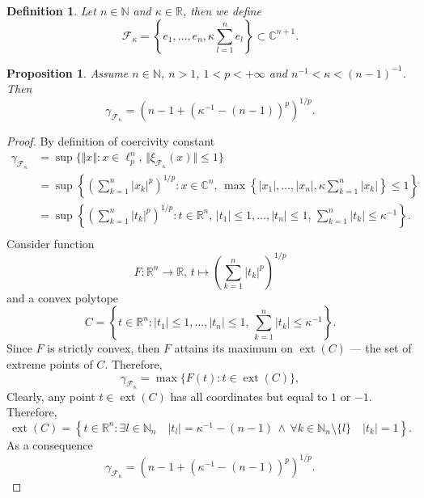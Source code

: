\documentclass[12pt]{article}
\newtheorem{proposition}[theorem]{Proposition}
\newtheorem{definition}[theorem]{Definition}
\begin{document}
\begin{definition}\label{SpclFuncFam}
    Let $n\in\mathbb{N}$ and $\kappa\in\mathbb{R}$, then we define 
    \[
        \mathcal{F}_{\kappa}
        =\left\{e_1,\ldots,e_n,\kappa \sum_{l=1}^n e_l\right\}
        \subset \mathbb{C}^{n+1}.
    \]
\end{definition}

\begin{proposition}\label{StdEmbdSpclCoerciv}
    Assume $n\in\mathbb{N}$, $n>1$, $1<p<+\infty$ 
    and $n^{-1}<\kappa<(n-1)^{-1}$. Then
    \[
        \gamma_{\mathcal{F}_{\kappa}}=(n-1+(\kappa^{-1}-(n-1))^p)^{1/p}.
    \]
\end{proposition}
\begin{proof}
    By definition of coercivity constant
    \[
    \begin{aligned}
        \gamma_{\mathcal{F}_{\kappa}}
        &=\sup\{
            \Vert x\Vert : 
            x\in\ell_{p}^n,\, \Vert \xi_{\mathcal{F}_{\kappa}}(x)\Vert\leq 1
        \} \\
        &=\sup\left\{
            \left( \sum_{k=1}^n |x_k|^p\right)^{1/p} : 
            x\in\mathbb{C}^n,\, 
            \max\left\{|x_1|,\ldots,|x_n|,\kappa\sum_{k=1}^n |x_k|\right\}\leq 1
        \right\} \\
        &=\sup\left\{
            \left( \sum_{k=1}^n |t_k|^p\right)^{1/p} : 
            t\in\mathbb{R}^n,\, 
            |t_1|\leq 1,\ldots,|t_n|\leq 1,\,\sum_{k=1}^n |t_k|\leq \kappa^{-1}
        \right\}. \\
    \end{aligned}
    \]
    Consider function
    \[
        F:
        \mathbb{R}^n\to\mathbb{R},\, 
        t\mapsto \left(\sum_{k=1}^n|t_k|^p\right)^{1/p}
    \]
    and a convex polytope
    \[
        C=\left\{ 
            t\in\mathbb{R}^n : 
            |t_1|\leq 1,\ldots,|t_n|\leq 1,\,\sum_{k=1}^n |t_k|\leq \kappa^{-1}
        \right\}.
    \]
    Since $F$ is strictly convex, then $F$ attains its maximum 
    on $\operatorname{ext}(C)$ --- the set of extreme points of $C$. Therefore,
    \[
        \gamma_{\mathcal{F}_{\kappa}}=\max\{F(t):t\in\operatorname{ext}(C)\},
    \]
    Clearly, any point $t\in \operatorname{ext}(C)$ has all coordinates but 
    equal to $1$ or $-1$. Therefore,
    \[
        \operatorname{ext}(C)=\left\{ 
            t\in\mathbb{R}^n : 
            \exists l\in\mathbb{N}_n\quad |t_l|=\kappa^{-1}-(n-1)\,\wedge\, 
            \forall k\in\mathbb{N}_n\setminus\{l\}\quad |t_k|=1
        \right\}.
    \]
    As a consequence
    \[
        \gamma_{\mathcal{F}_{\kappa}}=(n-1+(\kappa^{-1}-(n-1))^p)^{1/p}.
    \]
\end{proof}
\end{document}
